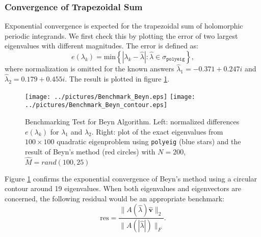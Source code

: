 \documentclass[11pt,letterpaper]{article}
\begin{document}
\subsubsection{Convergence of Trapezoidal Sum}
Exponential convergence is expected for the trapezoidal sum of holomorphic periodic integrands. We first check this by plotting the error of two largest eigenvalues with different magnitudes. The error is defined as: 
\begin{equation}
\label{eq:e}
e(\lambda_k) = \mathrm{min}\left\lbrace  |\lambda_k - \hat{\lambda}|:\hat{\lambda}\in\sigma_{\mathtt{polyeig}}\right\rbrace ,
\end{equation}
where normalization is omitted for the known answers  $\hat{\lambda}_1 = -0.371 + 0.247i$ and $\hat{\lambda}_2=
  0.179 + 0.455i$. The result is plotted in figure \ref{fig:Benchmark_Beyn}. 
\begin{figure}\label{fig:Benchmark_Beyn}
\begin{center}
\texttt{[image: ../pictures/Benchmark\_Beyn.eps]}
\texttt{[image: ../pictures/Benchmark\_Beyn\_contour.eps]}
\end{center}
\caption{Benchmarking Test for Beyn Algorithm. \textnormal{Left: normalized differences $e(\lambda_k)$ for $\lambda_1$ and $\lambda_2$. Right: plot of the exact eigenvalues from $100\times100$ quadratic eigenproblem using {\tt polyeig} (blue stars) and the result of Beyn's method (red circles) with $N=200$, $\hat{M}=rand(100,25)$}}
\end{figure}
Figure \ref{fig:Benchmark_Beyn} confirms the exponential convergence of Beyn's method using a circular contour around 19 eigenvalues. When both eigenvalues and eigenvectors are concerned, the following residual would be an appropriate benchmark:
\begin{equation}
\label{eq:Residual}
\mathrm{res}=\frac{\| A(\hat{\lambda})\mathbf{\hat{v}} \|_2 }{\|A(|\hat{\lambda}|) \|_F}.
\end{equation}

\end{document}
